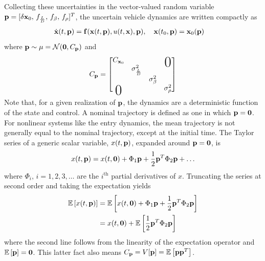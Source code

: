 Collecting these uncertainties in the vector-valued random variable $\mathbf{p} = [\delta\mathbf{x}_0,\, f_{\frac{L}{D}},\, f_{\beta},\, f_{\rho}]^T$, the uncertain vehicle dynamics are written compactly as
\begin{align}
	\dot{\mathbf{x}}(t,\mathbf{p}) &= \mathbf{f}(\mathbf{x}(t,\mathbf{p}), u(t,\mathbf{x}), \mathbf{p}),\quad
		\mathbf{x}(t_0,\mathbf{p}) = \mathbf{x}_0(\mathbf{p}) \label{Eq:UncertainDynamics}
\end{align}
where $\mathbf{p} \sim \mu = \mathcal{N}(\mathbf{0},C_{\mathbf{p}})$ and 
\begin{align}
	\cov_{\param} = \begin{bmatrix}
		\cov_{\state_0} & & &\bigzero \\ 
		 &\sigma^2_{\frac{L}{D}} \\
		 & & \sigma^2_{\beta} \\
		\bigzero & & & \sigma^2_{\rho}
	\end{bmatrix}
\end{align}
Note that, for a given realization of $\mathbf{p}$, the dynamics are a deterministic function of the state and control. A nominal trajectory is defined as one in which $\mathbf{p}=\mathbf{0}$. For nonlinear systems like the entry dynamics, the mean trajectory is not generally equal to the nominal trajectory, except at the initial time. 
The Taylor series of a generic scalar variable, $x(t,\mathbf{p})$, expanded around $\mathbf{p}=\mathbf{0}$, is 
\begin{align}
	x(t,\mathbf{p}) = x(t,\mathbf{0}) + \Phi_1\mathbf{p} + \frac{1}{2}\mathbf{p}^T\Phi_2\mathbf{p} + \dots
\end{align} 
where $\Phi_i,\,i=1,2,3,\dots$ are the $i^{\mathrm{th}}$ partial derivatives of $x$. 
Truncating the series at second order and taking the expectation yields
\begin{align}
	\mathbb{E}\left[x(t,\mathbf{p})\right] &= \mathbb{E}\left[x(t,\mathbf{0}) + \Phi_1\mathbf{p} + \frac{1}{2}\mathbf{p}^T\Phi_2\mathbf{p}\right] \\
	 &= x(t,\mathbf{0}) + \mathbb{E}\left[\frac{1}{2}\mathbf{p}^T\Phi_2\mathbf{p}\right]
\end{align}
where the second line follows from the linearity of the expectation operator and $\mathbb{E}\left[\mathbf{p}\right] = \mathbf{0}$. This latter fact also means $C_{\mathbf{p}} = V[\mathbf{p}] = \mathbb{E}\left[\mathbf{p}\mathbf{p}^T\right]$. 

